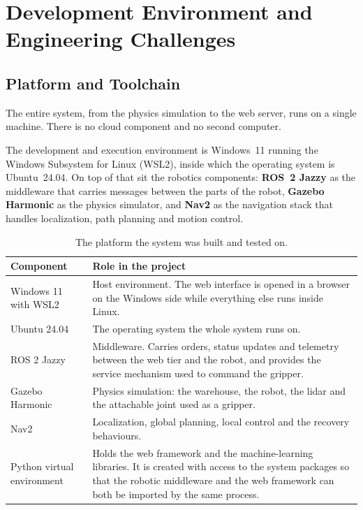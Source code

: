 \documentclass[12pt,a4paper]{report}
\begin{document}
\chapter{Development Environment and Engineering Challenges}
\label{ch:environment-challenges}

\section{Platform and Toolchain}
The entire system, from the physics simulation to the web server, runs on a single machine. There
is no cloud component and no second computer.

The development and execution environment is Windows~11 running the Windows Subsystem for Linux
(WSL2), inside which the operating system is Ubuntu~24.04. On top of that sit the robotics
components: \textbf{ROS~2 Jazzy} as the middleware that carries messages between the parts of the
robot, \textbf{Gazebo Harmonic} as the physics simulator, and \textbf{Nav2} as the navigation
stack that handles localization, path planning and motion control.

\begin{table}[H]
\centering
\begin{tabular}{@{}lp{}@{}}
\toprule
\textbf{Component} & \textbf{Role in the project} \\
\midrule
Windows 11 with WSL2 & Host environment. The web interface is opened in a browser on the Windows
side while everything else runs inside Linux. \\
Ubuntu 24.04 & The operating system the whole system runs on. \\
ROS 2 Jazzy & Middleware. Carries orders, status updates and telemetry between the web tier and the
robot, and provides the service mechanism used to command the gripper. \\
Gazebo Harmonic & Physics simulation: the warehouse, the robot, the lidar and the attachable joint
used as a gripper. \\
Nav2 & Localization, global planning, local control and the recovery behaviours. \\
Python virtual environment & Holds the web framework and the machine-learning libraries. It is
created with access to the system packages so that the robotic middleware and the web framework can
both be imported by the same process. \\
\bottomrule
\end{tabular}
\caption{The platform the system was built and tested on.}
\label{tab:platform}
\end{table}
\end{document}
